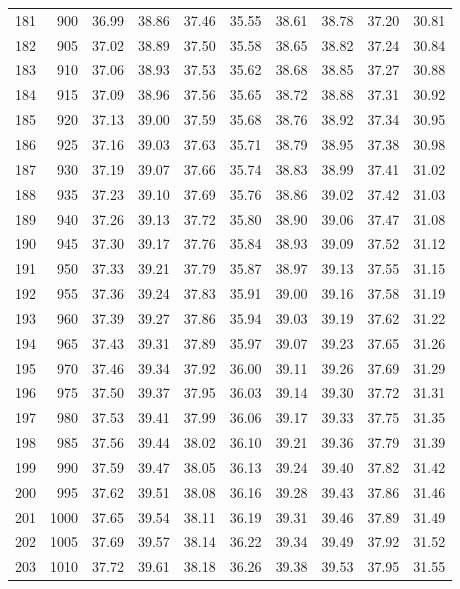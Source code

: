 \begin{longtable}{rrllllllll}
181 & 900 & 36.99 & 38.86 & 37.46 & 35.55 & 38.61 & 38.78 & 37.20 & 30.81 \\ 
182 & 905 & 37.02 & 38.89 & 37.50 & 35.58 & 38.65 & 38.82 & 37.24 & 30.84 \\ 
183 & 910 & 37.06 & 38.93 & 37.53 & 35.62 & 38.68 & 38.85 & 37.27 & 30.88 \\ 
184 & 915 & 37.09 & 38.96 & 37.56 & 35.65 & 38.72 & 38.88 & 37.31 & 30.92 \\ 
185 & 920 & 37.13 & 39.00 & 37.59 & 35.68 & 38.76 & 38.92 & 37.34 & 30.95 \\ 
186 & 925 & 37.16 & 39.03 & 37.63 & 35.71 & 38.79 & 38.95 & 37.38 & 30.98 \\ 
187 & 930 & 37.19 & 39.07 & 37.66 & 35.74 & 38.83 & 38.99 & 37.41 & 31.02 \\ 
188 & 935 & 37.23 & 39.10 & 37.69 & 35.76 & 38.86 & 39.02 & 37.42 & 31.03 \\ 
189 & 940 & 37.26 & 39.13 & 37.72 & 35.80 & 38.90 & 39.06 & 37.47 & 31.08 \\ 
190 & 945 & 37.30 & 39.17 & 37.76 & 35.84 & 38.93 & 39.09 & 37.52 & 31.12 \\ 
191 & 950 & 37.33 & 39.21 & 37.79 & 35.87 & 38.97 & 39.13 & 37.55 & 31.15 \\ 
192 & 955 & 37.36 & 39.24 & 37.83 & 35.91 & 39.00 & 39.16 & 37.58 & 31.19 \\ 
193 & 960 & 37.39 & 39.27 & 37.86 & 35.94 & 39.03 & 39.19 & 37.62 & 31.22 \\ 
194 & 965 & 37.43 & 39.31 & 37.89 & 35.97 & 39.07 & 39.23 & 37.65 & 31.26 \\ 
195 & 970 & 37.46 & 39.34 & 37.92 & 36.00 & 39.11 & 39.26 & 37.69 & 31.29 \\ 
196 & 975 & 37.50 & 39.37 & 37.95 & 36.03 & 39.14 & 39.30 & 37.72 & 31.31 \\ 
197 & 980 & 37.53 & 39.41 & 37.99 & 36.06 & 39.17 & 39.33 & 37.75 & 31.35 \\ 
198 & 985 & 37.56 & 39.44 & 38.02 & 36.10 & 39.21 & 39.36 & 37.79 & 31.39 \\ 
199 & 990 & 37.59 & 39.47 & 38.05 & 36.13 & 39.24 & 39.40 & 37.82 & 31.42 \\ 
200 & 995 & 37.62 & 39.51 & 38.08 & 36.16 & 39.28 & 39.43 & 37.86 & 31.46 \\ 
201 & 1000 & 37.65 & 39.54 & 38.11 & 36.19 & 39.31 & 39.46 & 37.89 & 31.49 \\ 
202 & 1005 & 37.69 & 39.57 & 38.14 & 36.22 & 39.34 & 39.49 & 37.92 & 31.52 \\ 
203 & 1010 & 37.72 & 39.61 & 38.18 & 36.26 & 39.38 & 39.53 & 37.95 & 31.55 \\ 

\end{longtable}
